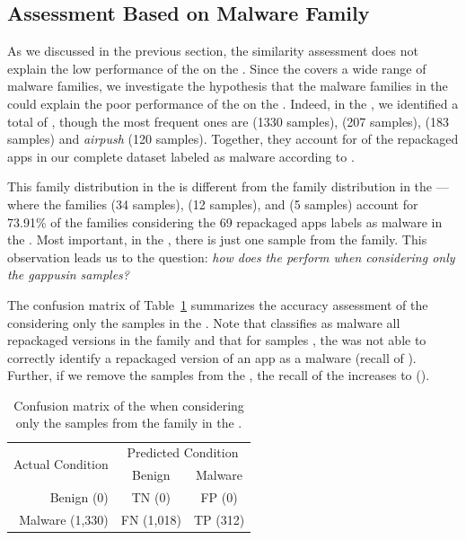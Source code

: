 \subsection{Assessment Based on Malware Family}


As we discussed in the previous
section, the similarity assessment does not explain the low performance of the
\mas on the \cds. Since the \cds covers a wide range of malware families, we investigate the
hypothesis that the malware families in the \cds could
explain the poor performance of the \mas on the \cds.
Indeed, in the \cds, we identified a total of
, though the most frequent
ones are \gps (1330 samples),  (207 samples),  (183 samples) and \emph{airpush} (120 samples). Together, they
account for  of the repackaged apps in our
complete dataset labeled as malware according to \vt.

This family distribution in the \cds is
different from the family
distribution in the \sds---where the
families  (34 samples),  (12 samples),
and  (5 samples) account for
73.91\% of the families considering the 69
repackaged apps \vt labels as malware in the \sds.
Most important, in the \sds, there is just one
sample from the \gps family. This observation
leads us to the question: \emph{how does the \mas
perform when considering only the gappusin samples?}



The confusion matrix of Table~\ref{tab:gappusin} summarizes the accuracy assessment of the \mas considering
only the \gps samples in the \cds. Note that \vt classifies as malware all repackaged versions in the \gps
family and that for  samples , the \mas was not able to correctly identify
a repackaged version of an app as a malware (recall of ). 
Further, if we remove the \gps
samples from the \cds, the recall
of the \mas increases to  (). 

\begin{table}[ht]
  \caption{Confusion matrix of the \mas when considering only the
  samples from the \gps family in the \cds.}
\centering
\begin{tabular}{r|cc} \hline
\multirow{2}{*}{Actual Condition}   & \multicolumn{2}{c}{Predicted Condition} \\ 
                                    & Benign    & Malware   \\ \hline 
  Benign  (0)                       & TN (0)    & FP (0)    \\
  Malware (1,330)                     & FN (1,018)  & TP (312)   \\ \hline
\end{tabular}
\label{tab:gappusin}
\end{table}


